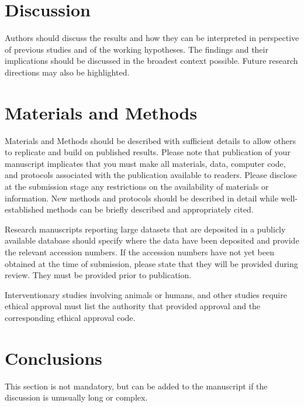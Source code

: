 \documentclass[entropy,article,submit,moreauthors,pdftex,10pt,a4paper]{mdpi}
\begin{document}
\section{Discussion}

Authors should discuss the results and how they can be interpreted in perspective of previous studies and of the working hypotheses. The findings and their implications should be discussed in the broadest context possible. Future research directions may also be highlighted.

\section{Materials and Methods}

Materials and Methods should be described with sufficient details to allow others to replicate and build on published results. Please note that publication of your manuscript implicates that you must make all materials, data, computer code, and protocols associated with the publication available to readers. Please disclose at the submission stage any restrictions on the availability of materials or information. New methods and protocols should be described in detail while well-established methods can be briefly described and appropriately cited.

Research manuscripts reporting large datasets that are deposited in a publicly available database should specify where the data have been deposited and provide the relevant accession numbers. If the accession numbers have not yet been obtained at the time of submission, please state that they will be provided during review. They must be provided prior to publication.

Interventionary studies involving animals or humans, and other studies require ethical approval must list the authority that provided approval and the corresponding ethical approval code. 

\section{Conclusions}

This section is not mandatory, but can be added to the manuscript if the discussion is unusually long or complex.

\vspace{6pt} 
\end{document}
